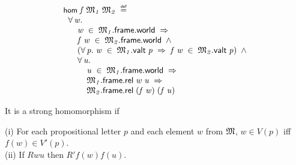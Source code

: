 \documentclass{report}
\renewcommand{\HOLConst}[1]{{\textsf{\upshape\small #1}}}
\renewcommand{\HOLinline}[1]{\ensuremath{#1}}
\newenvironment{holmath}{\begin{displaymath}\begin{array}{l}}{\end{array}\end{displaymath}\ignorespacesafterend}
\begin{document}
\begin{holmath}
  \HOLConst{hom}\;\HOLFreeVar{f}\;\HOLFreeVar{\ensuremath{\mathfrak{M}\sb{1}}}\;\HOLFreeVar{\ensuremath{\mathfrak{M}\sb{2}}}\;\HOLSymConst{\HOLTokenDefEquality{}}\\
\;\;\HOLSymConst{\HOLTokenForall{}}\HOLBoundVar{w}.\\
\;\;\;\;\;\;\HOLBoundVar{w}\;\HOLSymConst{\HOLTokenIn{}}\;\HOLFreeVar{\ensuremath{\mathfrak{M}\sb{1}}}.\HOLFieldName{frame}.\HOLFieldName{world}\;\HOLSymConst{\HOLTokenImp{}}\\
\;\;\;\;\;\;\HOLFreeVar{f}\;\HOLBoundVar{w}\;\HOLSymConst{\HOLTokenIn{}}\;\HOLFreeVar{\ensuremath{\mathfrak{M}\sb{2}}}.\HOLFieldName{frame}.\HOLFieldName{world}\;\HOLSymConst{\HOLTokenConj{}}\\
\;\;\;\;\;\;(\HOLSymConst{\HOLTokenForall{}}\HOLBoundVar{p}.\;\HOLBoundVar{w}\;\HOLSymConst{\HOLTokenIn{}}\;\HOLFreeVar{\ensuremath{\mathfrak{M}\sb{1}}}.\HOLFieldName{valt}\;\HOLBoundVar{p}\;\HOLSymConst{\HOLTokenImp{}}\;\HOLFreeVar{f}\;\HOLBoundVar{w}\;\HOLSymConst{\HOLTokenIn{}}\;\HOLFreeVar{\ensuremath{\mathfrak{M}\sb{2}}}.\HOLFieldName{valt}\;\HOLBoundVar{p})\;\HOLSymConst{\HOLTokenConj{}}\\
\;\;\;\;\;\;\HOLSymConst{\HOLTokenForall{}}\HOLBoundVar{u}.\\
\;\;\;\;\;\;\;\;\;\;\HOLBoundVar{u}\;\HOLSymConst{\HOLTokenIn{}}\;\HOLFreeVar{\ensuremath{\mathfrak{M}\sb{1}}}.\HOLFieldName{frame}.\HOLFieldName{world}\;\HOLSymConst{\HOLTokenImp{}}\\
\;\;\;\;\;\;\;\;\;\;\HOLFreeVar{\ensuremath{\mathfrak{M}\sb{1}}}.\HOLFieldName{frame}.\HOLFieldName{rel}\;\HOLBoundVar{w}\;\HOLBoundVar{u}\;\HOLSymConst{\HOLTokenImp{}}\\
\;\;\;\;\;\;\;\;\;\;\HOLFreeVar{\ensuremath{\mathfrak{M}\sb{2}}}.\HOLFieldName{frame}.\HOLFieldName{rel}\;(\HOLFreeVar{f}\;\HOLBoundVar{w})\;(\HOLFreeVar{f}\;\HOLBoundVar{u})
\end{holmath}

It is a strong homomorphism if

(i) For each propositional letter $p$ and each element $w$ from \HOLinline{\HOLFreeVar{\ensuremath{\mathfrak{M}}}}, $w\in V(p)$ iff $f(w) \in V'(p)$.\\
(ii) If $Rwu$ then $R'f(w)f(u)$.
\end{document}
